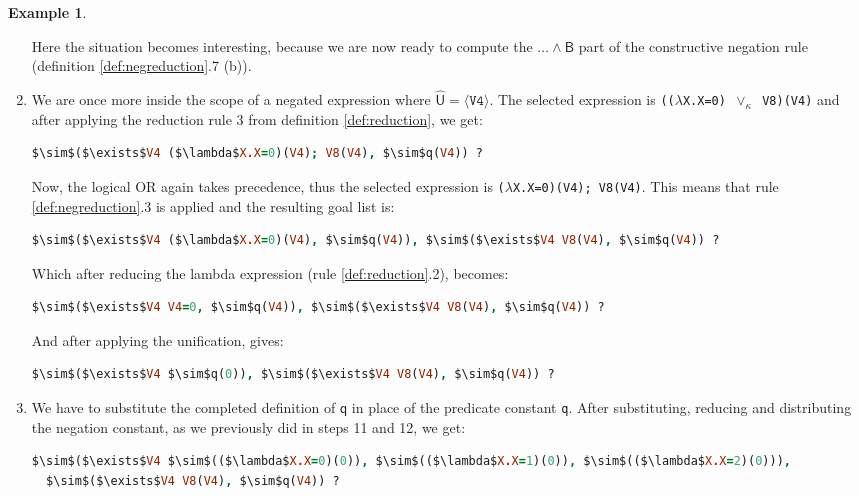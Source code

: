 \documentclass[inscr,ack,preface]{dithesis}
\theoremstyle{definition}
\newtheorem{example}{Example}[chapter]
\newcommand{\msf}[1]{$\mathsf{#1}$}
\begin{document}
\begin{example}
\begin{enumerate}
Here the situation becomes interesting, because we are now ready to compute the \msf{\ldots \land B} part of the constructive negation rule (definition \ref{def:negreduction}.7 (b)).

\item We are once more inside the scope of a negated expression where \msf{\widehat{U} = \langle \texttt{V4} \rangle}. The selected expression is \texttt{(($\lambda$X.X=0) $\vee_{\kappa}$ V8)(V4)} and after applying the reduction rule 3 from definition \ref{def:reduction}, we get:
\begin{lstlisting}[language=Prolog,%
  frame=single,breaklines=false,mathescape=true]
  $\sim$($\exists$V4 ($\lambda$X.X=0)(V4); V8(V4), $\sim$q(V4)) ?
\end{lstlisting}

Now, the logical OR again takes precedence, thus the selected expression is \texttt{($\lambda$X.X=0)(V4); V8(V4)}. This means that rule \ref{def:negreduction}.3 is applied and the resulting goal list is:
\begin{lstlisting}[language=Prolog,%
  frame=single,breaklines=false,mathescape=true]
  $\sim$($\exists$V4 ($\lambda$X.X=0)(V4), $\sim$q(V4)), $\sim$($\exists$V4 V8(V4), $\sim$q(V4)) ?
\end{lstlisting}

Which after reducing the lambda expression (rule \ref{def:reduction}.2), becomes:
\begin{lstlisting}[language=Prolog,%
  frame=single,breaklines=false,mathescape=true]
  $\sim$($\exists$V4 V4=0, $\sim$q(V4)), $\sim$($\exists$V4 V8(V4), $\sim$q(V4)) ?
\end{lstlisting}

And after applying the unification, gives:
\begin{lstlisting}[language=Prolog,%
  frame=single,breaklines=false,mathescape=true]
  $\sim$($\exists$V4 $\sim$q(0)), $\sim$($\exists$V4 V8(V4), $\sim$q(V4)) ?
\end{lstlisting}

\item We have to substitute the completed definition of \msf{q} in place of the predicate constant \texttt{q}. After substituting, reducing and distributing the negation constant, as we previously did in steps 11 and 12, we get:
\begin{lstlisting}[language=Prolog,%
  frame=single,breaklines=false,mathescape=true]
  $\sim$($\exists$V4 $\sim$(($\lambda$X.X=0)(0)), $\sim$(($\lambda$X.X=1)(0)), $\sim$(($\lambda$X.X=2)(0))),
  $\sim$($\exists$V4 V8(V4), $\sim$q(V4)) ?
\end{lstlisting}


\end{enumerate}
\end{example}
\end{document}
